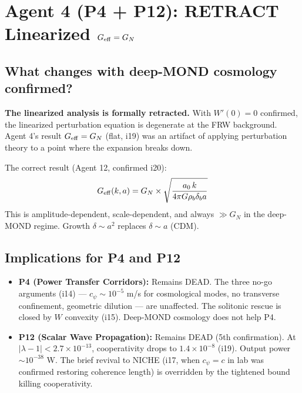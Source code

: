 \documentclass[11pt]{article}
\begin{document}
\newpage
\section{Agent 4 (P4 + P12): RETRACT Linearized $G_{\rm eff} = G_N$}
\label{sec:agent4}

\subsection{What changes with deep-MOND cosmology confirmed?}

\textbf{The linearized analysis is formally retracted.} With $W'(0) = 0$
confirmed, the linearized perturbation equation is degenerate at the FRW
background. Agent 4's result $G_{\rm eff} = G_N$ (flat, i19) was an artifact
of applying perturbation theory to a point where the expansion breaks down.

The correct result (Agent 12, confirmed i20):
\[
G_{\rm eff}(k,a) = G_N \times \sqrt{\frac{a_0 \, k}{4\pi G \rho_b \delta_b a}}
\]
This is amplitude-dependent, scale-dependent, and always $\gg G_N$ in the
deep-MOND regime. Growth $\delta \sim a^2$ replaces $\delta \sim a$ (CDM).

\subsection{Implications for P4 and P12}

\begin{itemize}
\item \textbf{P4 (Power Transfer Corridors):} Remains DEAD. The three no-go
arguments (i14) --- $c_\psi \sim 10^{-5}$ m/s for cosmological modes, no transverse
confinement, geometric dilution --- are unaffected. The solitonic rescue is
closed by $W$ convexity (i15). Deep-MOND cosmology does not help P4.

\item \textbf{P12 (Scalar Wave Propagation):} Remains DEAD (5th confirmation).
At $|\lambda - 1| < 2.7 \times 10^{-13}$, cooperativity drops to $1.4 \times 10^{-8}$
(i19). Output power $\sim 10^{-38}$ W. The brief revival to NICHE (i17, when
$c_\psi = c$ in lab was confirmed restoring coherence length) is overridden by
the tightened bound killing cooperativity.
\end{itemize}
\end{document}

